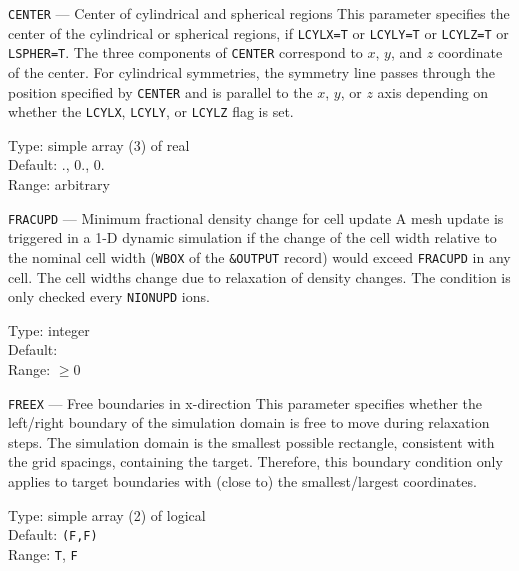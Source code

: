 \begin{keydescription}{\texttt{CENTER} --- Center of cylindrical and spherical 
regions}
%
  This parameter specifies the center of the cylindrical or spherical regions,
  if \texttt{LCYLX=T} or \texttt{LCYLY=T} or \texttt{LCYLZ=T} or 
  \texttt{LSPHER=T}. The three components of \texttt{CENTER} correspond to $x$, 
  $y$, and $z$ coordinate of the center. For cylindrical symmetries, the
  symmetry line passes through the position specified by \texttt{CENTER} and is
  parallel to the $x$, $y$, or $z$ axis depending on whether the \texttt{LCYLX},
  \texttt{LCYLY}, or \texttt{LCYLZ} flag is set.
  \begin{keytab}
    Type:    \> simple array (3) of real \\
    Default: ., 0., 0. \\
    Range:   \> arbitrary
  \end{keytab}
\end{keydescription}

\begin{keydescription}{\texttt{FRACUPD} --- Minimum fractional density
change for cell update}
%
  A mesh update is triggered in a 1-D dynamic simulation if the change of the
  cell width relative to the nominal cell width (\texttt{WBOX} of the
  \texttt{\&OUTPUT} record) would exceed \texttt{FRACUPD} in any cell. The cell
  widths change due to relaxation of density changes. The condition is only
  checked every \texttt{NIONUPD} ions. 
  \begin{keytab}
    Type:    \> integer \\
    Default:  \\
    Range:   \> $\ge 0$
  \end{keytab}
\end{keydescription}

\ifprivate
\begin{keydescription}{\texttt{FREEX} --- Free boundaries in x-direction}
%
  This parameter specifies whether the left/right boundary of the
  simulation domain is free to move during relaxation steps. The simulation
  domain is the smallest possible rectangle, consistent with the grid spacings,
  containing the target. Therefore, this boundary condition only applies to
  target boundaries with (close to) the smallest/largest coordinates.
  \begin{keytab}
    Type:    \> simple array (2) of logical \\
    Default: \> \texttt{(F,F)} \\
    Range:   \> \texttt{T}, \texttt{F} 
  \end{keytab}
\end{keydescription}

